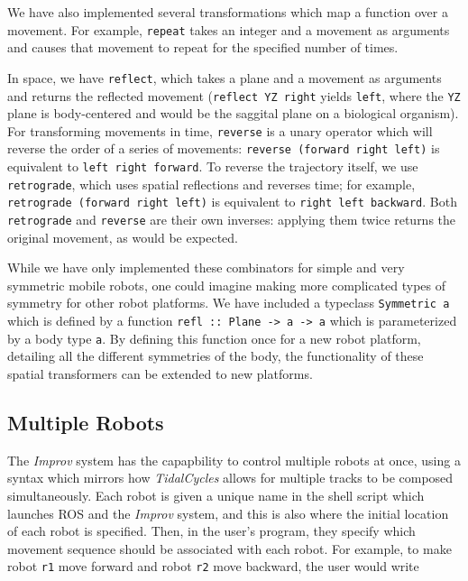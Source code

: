 \documentclass[sigconf]{acmart}
\begin{document}
We have also implemented several transformations which map a function
over a movement. For example, \texttt{repeat} takes an integer and a
movement as arguments and causes that movement to repeat for the
specified number of times.

In space, we have \texttt{reflect}, which takes a plane and a movement
as arguments and returns the reflected movement
(\texttt{reflect\ YZ\ right} yields \texttt{left}, where the \texttt{YZ}
plane is body-centered and would be the saggital plane on a biological
organism). For transforming movements in time, \texttt{reverse} is a
unary operator which will reverse the order of a series of movements:
\texttt{reverse\ (forward\ right\ left)} is equivalent to
\texttt{left\ right\ forward}. To reverse the trajectory itself, we use
\texttt{retrograde}, which uses spatial reflections and reverses time;
for example, \texttt{retrograde\ (forward\ right\ left)} is equivalent
to \texttt{right\ left\ backward}. Both \texttt{retrograde} and
\texttt{reverse} are their own inverses: applying them twice returns the
original movement, as would be expected.

While we have only implemented these combinators for simple and very
symmetric mobile robots, one could imagine making more complicated types
of symmetry for other robot platforms. We have included a typeclass
\texttt{Symmetric\ a} which is defined by a function
\texttt{refl\ ::\ Plane\ -\textgreater{}\ a\ -\textgreater{}\ a} which
is parameterized by a body type \texttt{a}. By defining this function
once for a new robot platform, detailing all the different symmetries of
the body, the functionality of these spatial transformers can be
extended to new platforms.

\subsection{Multiple Robots}\label{multiple-robots}

The \emph{Improv} system has the capapbility to control multiple robots
at once, using a syntax which mirrors how \emph{TidalCycles} allows for
multiple tracks to be composed simultaneously. Each robot is given a
unique name in the shell script which launches ROS and the \emph{Improv}
system, and this is also where the initial location of each robot is
specified. Then, in the user's program, they specify which movement
sequence should be associated with each robot. For example, to make
robot \texttt{r1} move forward and robot \texttt{r2} move backward, the
user would write
\end{document}
